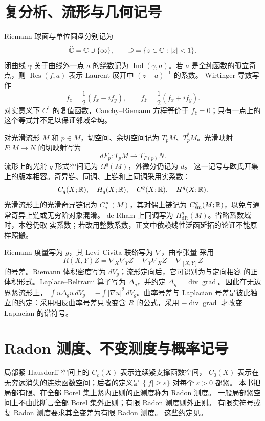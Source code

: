 \section{复分析、流形与几何记号}

Riemann 球面与单位圆盘分别记为
\[
 \widehat{\mathbb{C}}=\mathbb{C}\cup\{\infty\},\qquad
 \mathbb D=\{z\in\mathbb{C}:|z|<1\}.
\]
闭曲线 \(\gamma\) 关于曲线外一点 \(a\) 的绕数记为
\(\operatorname{Ind}(\gamma,a)\)。若 \(a\) 是全纯函数的孤立奇点，则
\(\operatorname{Res}(f,a)\) 表示 Laurent 展开中 \((z-a)^{-1}\) 的系数。
Wirtinger 导数写作
\[
 f_z=\frac12(f_x-if_y),\qquad
 f_{\bar z}=\frac12(f_x+if_y).
\]
对实意义下 \(C^1\) 的复值函数，Cauchy--Riemann 方程等价于
\(f_{\bar z}=0\)；只有一点上的这个等式并不足以保证邻域全纯。

对光滑流形 \(M\) 和 \(p\in M\)，切空间、余切空间记为
\(T_pM\)、\(T_p^*M\)。光滑映射 \(F:M\to N\) 的切映射写为
\[
 dF_p:T_pM\longrightarrow T_{F(p)}N.
\]
流形上的光滑 \(q\)-形式空间记为 \(\Omega^q(M)\)，外微分仍记为 \(d\)。
这一记号与欧氏开集上的版本相容。奇异链、同调、上链和上同调采用实系数：
\[
 C_q(X;\mathbb{R}),\quad H_q(X;\mathbb{R}),\quad
 C^q(X;\mathbb{R}),\quad H^q(X;\mathbb{R}).
\]
光滑流形上的光滑奇异链记为 $C_q^\infty(M)$，其对偶上链记为
$C_{\mathrm{sm}}^q(M;\mathbb{R})$，以免与通常奇异上链或无穷阶对象混淆。
de Rham 上同调写为 \(H_{\mathrm{dR}}^q(M)\)。省略系数域时，本卷仍取
实系数；若改用整数系数，正文中依赖线性泛函延拓的论证不能原样照搬。

Riemann 度量写为 \(g\)，其 Levi--Civita 联络写为 \(\nabla\)，曲率张量
采用
\[
 R(X,Y)Z=\nabla_X\nabla_YZ-\nabla_Y\nabla_XZ-\nabla_{[X,Y]}Z
\]
的号差。Riemann 体积密度写为 \(dV_g\)；流形定向后，它可识别为与定向相容
的正体积形式。Laplace--Beltrami 算子写为 \(\Delta_g\)，并约定
\(\Delta_g=\operatorname{div}\operatorname{grad}\)。因此在无边界紧流形上，
\(\int u\Delta_gu\,dV_g=-\int|\nabla u|^2\,dV_g\)。曲率号差与 Laplacian
号差是彼此独立的约定：采用相反曲率号差只改变含 \(R\) 的公式，采用
\(-\operatorname{div}\operatorname{grad}\) 才改变 Laplacian 的谱符号。

\section{Radon 测度、不变测度与概率记号}

局部紧 Hausdorff 空间上的 \(C_c(X)\) 表示连续紧支撑函数空间，
\(C_0(X)\) 表示在无穷远消失的连续函数空间；后者的定义是
\(\{|f|\ge\varepsilon\}\) 对每个 \(\varepsilon>0\) 都紧。
本书把局部有限、在全部 Borel 集上紧内正则的正测度称为 Radon 测度。
一般局部紧空间上不由此断言全部 Borel 集外正则；有限 Radon 测度则外正则。
有限实符号或复 Radon 测度要求其全变差为有限 Radon 测度。
这些约定见。

